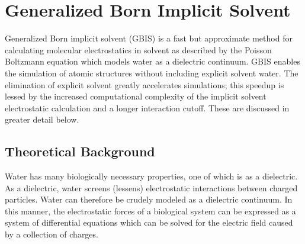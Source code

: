\begin{comment}
\documentclass[11pt]{article}
\usepackage{graphicx}
\usepackage{makeidx}
\usepackage{amssymb}
\usepackage{amsmath}
\usepackage[stable]{footmisc}

\newcommand{\NAMDCONFWDEF}[5]{%
  {\bf \tt #1 } $<$ #2 $>$ \index{#1 parameter} \\%
  {\bf Acceptable Values: } #3 \\%
  {\bf Default Value: } #4 \\%
  {\bf Description: } #5%
}



\end{comment}

\section{Generalized Born Implicit Solvent}
\label{section:gbis}

Generalized Born implicit solvent (GBIS) is a fast but approximate method for calculating molecular electrostatics in solvent as described by the Poisson Boltzmann equation which models water as a dielectric continuum.
GBIS enables the simulation of atomic structures without including explicit solvent water.
The elimination of explicit solvent greatly accelerates simulations;
this speedup is lessed by the increased computational complexity of the implicit solvent electrostatic calculation and a longer interaction cutoff.
These are discussed in greater detail below.


\subsection{Theoretical Background}
Water has many biologically necessary properties, one of which is as a dielectric.
As a dielectric, water screens (lessens) electrostatic interactions between charged particles. 
Water can therefore be crudely modeled as a dielectric continuum.
In this manner, the electrostatic forces of a biological system can be expressed as a system of differential equations which can be solved for the electric field caused by a collection of charges.


